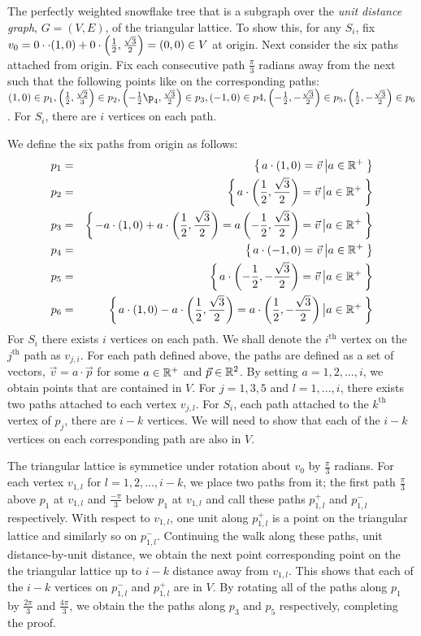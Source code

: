 The perfectly weighted snowflake tree that is a subgraph over the \textit{unit distance graph}, $G=(V,E)$, of the triangular lattice.  To show this, for any $S_i$, fix $v_0 = 0 \cdot \cdot (1,0) + 0 \cdot \left(\frac{1}{2},\frac{\sqrt{3}}{2}\right)=\left( 0,0 \right) \in V$ at origin.  Next consider the six paths attached from origin.  Fix each consecutive path $\frac{\pi}{3}$ radians away from the next such that the following points like on the corresponding paths: $\lr{1,0} \in p_1, \lr{\frac{1}{2} ,\frac{\sqrt{2}}{3}} \in p_2,\lr{-\frac{1}{2}\p_4,\frac{\sqrt{3}}{2}} \in p_3, \lr{-1,0} \in p4, \lr{-\frac{1}{2},-\frac{\sqrt{3}}{2}}\in p_5,\lr{\frac{1}{2},-\frac{\sqrt{3}}{2}}\in p_6$.  For $S_i$, there are $i$ vertices on each path.  

We define the six paths from origin as follows:
\begin{eqnarray*}
p_1 &=& {\left\lbrace \left. a\cdot\left( 1,0 \right) = \vec{v} \left\vert a \in {\mathbb{R}}^+ \right.\right.\right\rbrace }\\
p_2 &=& {\left\lbrace \left. a\cdot\left( \frac{1}{2},\frac{\sqrt{3}}{2} \right) = \vec{v} \left\vert a \in {\mathbb{R}}^+ \right.\right.\right\rbrace }\\
p_3 &=& {\left\lbrace \left. -a\cdot \left( 1,0 \right) + a \cdot \left( \frac{1}{2},\frac{\sqrt{3}}{2} \right) = a\left( -\frac{1}{2},\frac{\sqrt{3}}{2} \right) = \vec{v} \left\vert a \in {\mathbb{R}}^+ \right.\right.\right\rbrace }\\
p_4 &=& {\left\lbrace \left. a \cdot \left( -1,0 \right) = \vec{v} \left\vert a \in {\mathbb{R}}^+ \right.\right.\right\rbrace }\\
p_5 &=& {\left\lbrace \left. a \cdot \left( -\frac{1}{2},-\frac{\sqrt{3}}{2} \right)  = \vec{v} \left\vert a \in {\mathbb{R}}^+ \right.\right.\right\rbrace }\\
p_6 &=& {\left\lbrace \left.  a\cdot \left( 1,0 \right) - a \cdot \left( \frac{1}{2},\frac{\sqrt{3}}{2} \right)= a \cdot \left( \frac{1}{2}, -\frac{\sqrt{3}}{2} \right) \left\vert a \in {\mathbb{R}}^+ \right.\right.\right\rbrace } 
\end{eqnarray*}
For $S_i$ there exists $i$ vertices on each path.  We shall denote the $i^\text{th}$ vertex on the $j^\text{th}$ path as $v_{j,i}$.  For each path defined above, the paths are defined as a set of vectors, $\vec{v} = a \cdot \vec{p}$  for some $a \in {\mathbb{R}}^+$ and $\vec{p} \in {\mathbb{R}}^2$.  By setting $a = 1,2,\dots, i$, we obtain points that are contained in $V$.  For $j = 1,3,5$ and $l = 1,..., i$, there exists two paths attached to each vertex $v_{j,l}$.  For $S_i$, each path attached to the $k^\text{th}$ vertex of $p_j$, there are $i-k$ vertices.  We will need to show that each of the $i-k$ vertices on each corresponding path are also in $V$.

The triangular lattice is symmetice under rotation about $v_0$ by $\frac{\pi}{3}$ radians.  For each vertex $v_{1,l}$ for $l=1,2,..., i-k$, we place two paths from it; the first path $\frac{\pi}{3}$ above $p_1$ at $v_{1,l}$ and $\frac{-\pi}{3}$ below $p_1$ at $v_{1,l}$ and call these paths $p_{1,l}^+$ and $p_{1,l}^-$ respectively.  With respect to $v_{1,l}$, one unit along $p_{1,l}^+$ is a point on the triangular lattice and similarly so on $p_{1,l}^-$.  Continuing the walk along these paths, unit distance-by-unit distance, we obtain the next point corresponding point on the the triangular lattice up to $i-k$ distance away from $v_{1,l}$.  This shows that each of the $i-k$ vertices on $p_{1,l}^-$ and $p_{1,l}^+$ are in $V$.  By rotating all of the paths along $p_1$ by $\frac{2\pi}{3}$ and $\frac{4\pi}{3}$, we obtain the the paths along $p_3$ and $p_5$ respectively, completing the proof.

